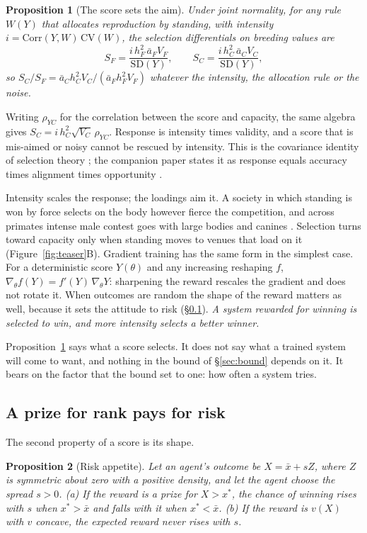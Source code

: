 \documentclass[10pt,twocolumn]{article}
\theoremstyle{plain}
\newtheorem{proposition}{Proposition}
\theoremstyle{definition}
\begin{document}
\begin{proposition}[The score sets the aim]\label{prop:aim}
Under joint normality, for any rule $W(Y)$ that allocates reproduction by standing, with
intensity $i=\mathrm{Corr}(Y,W)\,\mathrm{CV}(W)$, the selection differentials on breeding
values are
\[
S_F=\frac{i\,h_F^2\,\bar a_F V_F}{\mathrm{SD}(Y)},\qquad
S_C=\frac{i\,h_C^2\,\bar a_C V_C}{\mathrm{SD}(Y)},
\]
so $S_C/S_F=\bar a_C h_C^2V_C/(\bar a_F h_F^2V_F)$ whatever the intensity, the allocation
rule or the noise.
\end{proposition}

Writing $\rho_{YC}$ for the correlation between the score and capacity, the same algebra
gives $S_C=i\,h_C^2\sqrt{V_C}\,\rho_{YC}$. Response is intensity times validity, and a score
that is mis-aimed or noisy cannot be rescued by intensity. This is the covariance identity of
selection theory \cite{price1970,lande1983}; the companion paper states it as response
equals accuracy times alignment times opportunity \cite{taylor2026pbo}.

Intensity scales the response; the loadings aim it. A society in which standing is won by
force selects on the body however fierce the competition, and across primates intense male
contest goes with large bodies and canines \cite{plavcan2012}. Selection turns toward
capacity only when standing moves to venues that load on it (Figure~\ref{fig:teaser}B). Gradient training has the same form in the simplest case. For a deterministic score
$Y(\theta)$ and any increasing reshaping $f$, $\nabla_{\theta}f(Y)=f'(Y)\,\nabla_{\theta}Y$:
sharpening the reward rescales the gradient and does not rotate it. When outcomes are random
the shape of the reward matters as well, because it sets the attitude to risk
(\S\ref{sec:risk}). \emph{A system rewarded for winning is selected to win, and more
intensity selects a better winner.}

Proposition~\ref{prop:aim} says what a score selects. It does not say what a trained system
will come to want, and nothing in the bound of \S\ref{sec:bound} depends on it. It bears on
the factor that the bound set to one: how often a system tries.

\subsection{A prize for rank pays for risk}\label{sec:risk}

The second property of a score is its shape.

\begin{proposition}[Risk appetite]\label{prop:risk}
Let an agent's outcome be $X=\bar x+sZ$, where $Z$ is symmetric about zero with a positive
density, and let the agent choose the spread $s>0$. (a) If the reward is a prize for
$X>x^{*}$, the chance of winning rises with $s$ when $x^{*}>\bar x$ and falls with it when
$x^{*}<\bar x$. (b) If the reward is $v(X)$ with $v$ concave, the expected reward never rises
with $s$.
\end{proposition}
\end{document}

